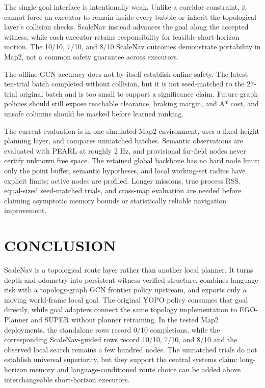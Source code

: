 \documentclass[letterpaper,10pt,conference]{ieeeconf}
\begin{document}
The single-goal interface is intentionally weak.  Unlike a corridor constraint,
it cannot force an executor to remain inside every bubble or inherit the
topological layer's collision checks.  ScaleNav instead advances the goal along
the accepted witness, while each executor retains responsibility for feasible
short-horizon motion.  The 10/10, 7/10, and 8/10 ScaleNav outcomes demonstrate
portability in Map2, not a common safety guarantee across executors.

The offline GCN accuracy does not by itself establish online safety.  The
latest ten-trial batch completed without collision, but it is not seed-matched
to the 27-trial original batch and is too small to support a significance
claim.  Future graph policies should still expose reachable clearance,
braking margin, and A* cost, and unsafe columns should be masked before
learned ranking.

The current evaluation is in one simulated Map2 environment, uses a
fixed-height planning layer, and compares unmatched batches.  Semantic
observations are evaluated with PEARL at roughly 2 Hz, and provisional
far-field nodes never certify unknown free space.  The retained global
backbone has no hard node limit; only the point buffer, semantic hypotheses,
and local working-set radius have explicit limits; active nodes are profiled.
Longer missions,
true process RSS, equal-sized seed-matched trials, and cross-map evaluation are
needed before claiming asymptotic memory bounds or statistically reliable
navigation improvement.

\section{CONCLUSION}
ScaleNav is a topological route layer rather than another local planner.  It
turns depth and odometry into persistent witness-verified structure, combines
language risk with a topology-graph GCN frontier policy upstream, and exports only
a moving world-frame local goal.  The original YOPO policy consumes that goal
directly, while goal adapters connect the same topology implementation to
EGO-Planner and SUPER without planner retraining.  In the tested Map2
deployments, the standalone rows record 0/10 completions, while the
corresponding ScaleNav-guided rows record 10/10, 7/10, and 8/10 and the
observed local search remains a few hundred nodes.  The
unmatched trials do not establish universal superiority, but they support the
central systems claim: long-horizon memory and language-conditioned route
choice can be added above interchangeable short-horizon executors.
\end{document}
